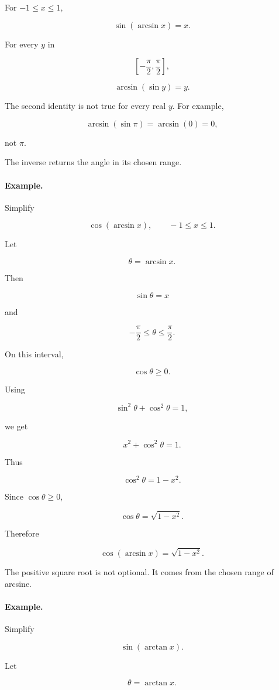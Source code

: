 For \(-1\le x\le1\),

\[
\boxed{
\sin(\arcsin x)=x.
}
\]

For every \(y\) in

\[
\left[-\frac{\pi}{2},\frac{\pi}{2}\right],
\]

\[
\boxed{
\arcsin(\sin y)=y.
}
\]

The second identity is not true for every real \(y\).  For example,

\[
\arcsin(\sin \pi)=\arcsin(0)=0,
\]

not \(\pi\).

The inverse returns the angle in its chosen range.

\paragraph{Example.}
Simplify

\[
\cos(\arcsin x),
\qquad -1\le x\le1.
\]

Let

\[
\theta=\arcsin x.
\]

Then

\[
\sin\theta=x
\]

and

\[
-\frac{\pi}{2}\le \theta\le \frac{\pi}{2}.
\]

On this interval,

\[
\cos\theta\ge0.
\]

Using

\[
\sin^2\theta+\cos^2\theta=1,
\]

we get

\[
x^2+\cos^2\theta=1.
\]

Thus

\[
\cos^2\theta=1-x^2.
\]

Since \(\cos\theta\ge0\),

\[
\cos\theta=\sqrt{1-x^2}.
\]

Therefore

\[
\boxed{
\cos(\arcsin x)=\sqrt{1-x^2}.
}
\]

The positive square root is not optional.  It comes from the chosen range of arcsine.

\paragraph{Example.}
Simplify

\[
\sin(\arctan x).
\]

Let

\[
\theta=\arctan x.
\]

